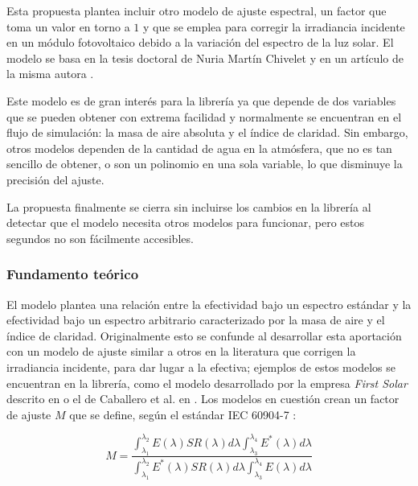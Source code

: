 Esta propuesta plantea incluir otro modelo de ajuste espectral, un factor que toma un valor en torno a $1$ y que se emplea para corregir la irradiancia incidente en un módulo fotovoltaico debido a la variación del espectro de la luz solar. El modelo se basa en la tesis doctoral de Nuria Martín Chivelet \cite{Martín_Chivelet_1999} y en un artículo de la misma autora \cite{Martín_Ruiz_1999}.

Este modelo es de gran interés para la librería ya que depende de dos variables que se pueden obtener con extrema facilidad y normalmente se encuentran en el flujo de simulación: la masa de aire absoluta y el índice de claridad. Sin embargo, otros modelos dependen de la cantidad de agua en la atmósfera, que no es tan sencillo de obtener, o son un polinomio en una sola variable, lo que disminuye la precisión del ajuste. 

La propuesta finalmente se cierra sin incluirse los cambios en la librería al detectar que el modelo necesita otros modelos para funcionar, pero estos segundos no son fácilmente accesibles.

\subsubsection{Fundamento teórico}

El modelo \cite{Martín_Ruiz_1999} plantea una relación entre la efectividad bajo un espectro estándar y la efectividad bajo un espectro arbitrario caracterizado por la masa de aire y el índice de claridad. Originalmente esto se confunde al desarrollar esta aportación con un modelo de ajuste similar a otros en la literatura que corrigen la irradiancia incidente, para dar lugar a la efectiva; ejemplos de estos modelos se encuentran en la librería, como el modelo desarrollado por la empresa \textit{First Solar} descrito en \cite{Lee_Panchula_2016} o el de Caballero et al. en \cite{Caballero_Fernández_Theristis_Almonacid_Nofuentes_2018}. Los modelos en cuestión crean un factor de ajuste $M$ que se define, según el estándar IEC 60904-7 \cite[Eq. (2)]{Caballero_Fernández_Theristis_Almonacid_Nofuentes_2018}:

\begin{equation}
    M = \frac
    {\int_{\lambda_1}^{\lambda_2} E(\lambda) SR(\lambda) d\lambda \int_{\lambda_3}^{\lambda_4} E^*(\lambda) d\lambda}
    {\int_{\lambda_1}^{\lambda_2} E^*(\lambda) SR(\lambda) d\lambda \int_{\lambda_3}^{\lambda_4} E(\lambda) d\lambda}
\end{equation}

